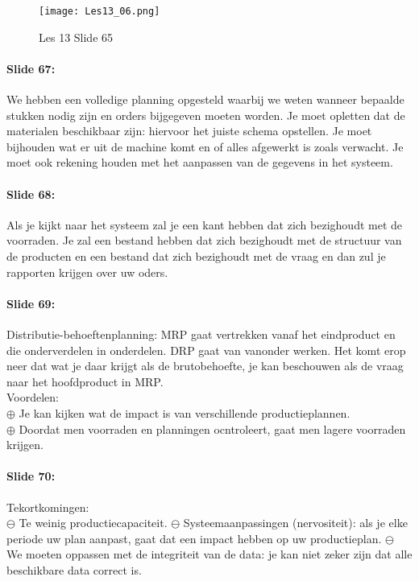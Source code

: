 \documentclass[10pt,a4paper]{report}
\begin{document}
\begin{figure}[h!]
\centering
\texttt{[image: Les13\_06.png]}
\caption{Les 13 Slide 65} 
\label{les13_06}
\end{figure}

\paragraph{Slide 67:} We hebben een volledige planning opgesteld waarbij we weten wanneer bepaalde stukken nodig zijn en orders bijgegeven moeten worden. Je moet opletten dat de materialen beschikbaar zijn: hiervoor het juiste schema opstellen. Je moet bijhouden wat er uit de machine komt en of alles afgewerkt is zoals verwacht. Je moet ook rekening houden met het aanpassen van de gegevens in het systeem.

\paragraph{Slide 68:} Als je kijkt naar het systeem zal je een kant hebben dat zich bezighoudt met de voorraden. Je zal een bestand hebben dat zich bezighoudt met de structuur van de producten en een bestand dat zich bezighoudt met de vraag en dan zul je rapporten krijgen over uw oders.

\paragraph{Slide 69:} Distributie-behoeftenplanning: MRP gaat vertrekken vanaf het eindproduct en die onderverdelen in onderdelen. DRP gaat van vanonder werken. Het komt erop neer dat wat je daar krijgt als de brutobehoefte, je kan beschouwen als de vraag naar het hoofdproduct in MRP.\\
Voordelen:\\
$\oplus$ Je kan kijken wat de impact is van verschillende productieplannen.\\
$\oplus$ Doordat men voorraden en planningen ocntroleert, gaat men lagere voorraden krijgen.

\paragraph{Slide 70:} Tekortkomingen:\\
$\ominus$ Te weinig productiecapaciteit.
$\ominus$ Systeemaanpassingen (nervositeit): als je elke periode uw plan aanpast, gaat dat een impact hebben op uw productieplan. 
$\ominus$ We moeten oppassen met de integriteit van de data: je kan niet zeker zijn dat alle beschikbare data correct is.
\end{document}
